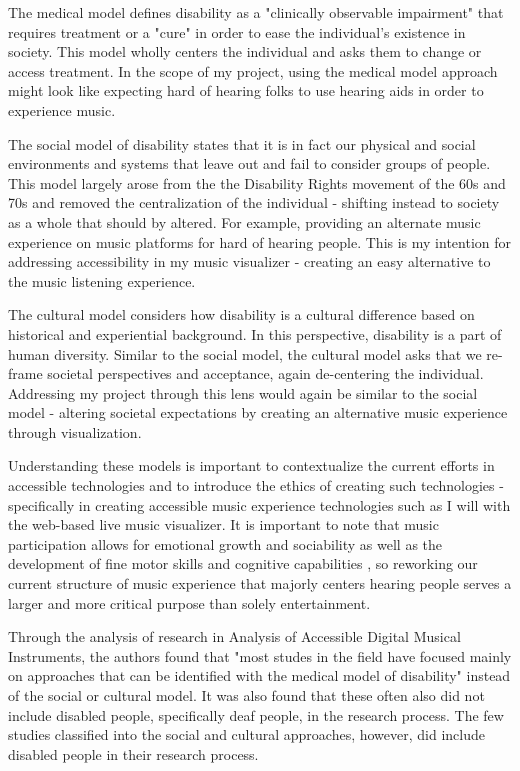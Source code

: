 \documentclass[10pt,twocolumn]{article}
\begin{document}
The medical model defines disability as a "clinically observable impairment" \cite{ADMIs} that requires treatment or a "cure" in order to ease the individual's existence in society. This model wholly centers the individual and asks them to change or access treatment. In the scope of my project, using the medical model approach might look like expecting hard of hearing folks to use hearing aids in order to experience music. 

The social model of disability states that it is in fact our physical and social environments and systems that leave out and fail to consider groups of people\cite{ADMIs}. This model largely arose from the the Disability Rights movement of the 60s and 70s and removed the centralization of the individual - shifting instead to society as a whole that should by altered. For example, providing an alternate music experience on music platforms for hard of hearing people. This is my intention for addressing accessibility in my music visualizer - creating an easy alternative to the music listening experience. 

The cultural model considers how disability is a cultural difference based on historical and experiential background\cite{ADMIs}. In this perspective, disability is a part of human diversity. Similar to the social model, the cultural model asks that we re-frame societal perspectives and acceptance, again de-centering the individual. Addressing my project through this lens would again be similar to the social model - altering societal expectations by creating an alternative music experience through visualization. 


Understanding these models is important to contextualize the current efforts in accessible technologies and to introduce the ethics of creating such technologies - specifically in creating accessible music experience technologies such as I will with the web-based live music visualizer. It is important to note that music participation allows for emotional growth and sociability as well as the development of fine motor skills and cognitive capabilities \cite{ADMIs}, so reworking our current structure of music experience that majorly centers hearing people serves a larger and more critical purpose than solely entertainment.

Through the analysis of research in Analysis of Accessible Digital Musical Instruments, the authors found that "most studes in the field have focused mainly on approaches that can be identified with the medical model of disability" instead of the social or cultural model. It was also found that these often also did not include disabled people, specifically deaf people, in the research process\cite{ADMIs}. The few studies classified into the social and cultural approaches, however, did include disabled people in their research process. 
\end{document}

